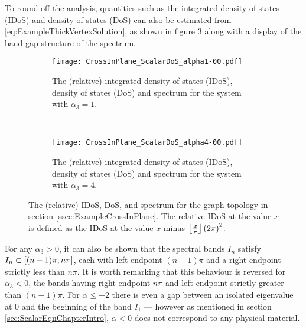 To round off the analysis, quantities such as the integrated density of states (IDoS) and density of states (DoS) can also be estimated from \eqref{eq:ExampleThickVertexSolution}, as shown in figure \ref{fig:CrossInPlane_ScalarDoS} along with a display of the band-gap structure of the spectrum.
\begin{figure}[t!]
	\begin{subfigure}[t]{0.45\textwidth}
		\centering
		\texttt{[image: CrossInPlane\_ScalarDoS\_alpha1-00.pdf]}
		\caption[]{\label{fig:CrossInPlane_ScalarDoS_alpha1-00} The (relative) integrated density of states (IDoS), density of states (DoS) and spectrum for the system with $\alpha_3=1$.}
	\end{subfigure}
	~
	\begin{subfigure}[t]{0.45\textwidth}
		\centering
		\texttt{[image: CrossInPlane\_ScalarDoS\_alpha4-00.pdf]}
		\caption[]{\label{fig:CrossInPlane_ScalarDoS_alpha4-00} The (relative) integrated density of states (IDoS), density of states (DoS) and spectrum for the system with $\alpha_3=4$.}
	\end{subfigure}	
	\caption[The spectrum and density of states for the problem \eqref{eq:ScalarWaveEqn} on the cross-in-the-plane geometry.]{\label{fig:CrossInPlane_ScalarDoS} The (relative) IDoS, DoS, and spectrum for the graph topology in section \ref{ssec:ExampleCrossInPlane}.
	The relative IDoS at the value $x$ is defined as the IDoS at the value $x$ minus $\left\lfloor\frac{x}{\pi}\right\rfloor\left( 2\pi \right)^2$.}
\end{figure}
For any $\alpha_3>0$, it can also be shown that the spectral bands $I_n$ satisfy $I_n\subset\left[ (n-1)\pi, n\pi \right]$, each with left-endpoint $(n-1)\pi$ and a right-endpoint strictly less than $n\pi$.
It is worth remarking that this behaviour is reversed for $\alpha_3<0$, the bands having right-endpoint $n\pi$ and left-endpoint strictly greater than $(n-1)\pi$.
For $\alpha\leq-2$ there is even a gap between an isolated eigenvalue at $0$ and the beginning of the band $I_1$ --- however as mentioned in section \ref{sec:ScalarEqnChapterIntro}, $\alpha<0$ does not correspond to any physical material.
